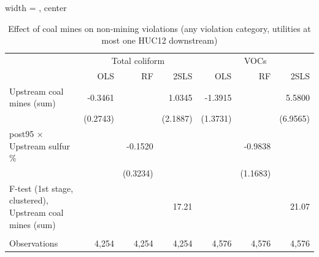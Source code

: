 
\begin{table}[htbp]
   
   \caption{\label{2sls_dwnstrm_nonminevio_allcat_ivsum} Effect of coal mines on non-mining violations (any violation category, utilities at most one HUC12 downstream)}
   \bigskip
   
   \centering
   
   \begin{adjustbox}{width = \textwidth, center}
      
      
      \begin{tabular}{lrrrrrr}
         \toprule
         
          & \multicolumn{3}{c}{Total coliform} & \multicolumn{3}{c}{VOCs}\\
         
                                                                  & OLS      & RF       & 2SLS     & OLS      & RF       & 2SLS\\  
         
         \midrule 
         Upstream coal mines (sum)                                & -0.3461  &          & 1.0345   & -1.3915  &          & 5.5800\\   
                                                                  & (0.2743) &          & (2.1887) & (1.3731) &          & (6.9565)\\   
         post95 $\times$ Upstream sulfur \%                       &          & -0.1520  &          &          & -0.9838  &   \\   
                                                                  &          & (0.3234) &          &          & (1.1683) &   \\   
         
         F-test (1st stage, clustered), Upstream coal mines (sum) &          &          & 17.21    &          &          & 21.07\\  
         
          \\
         
         Observations                                             & 4,254    & 4,254    & 4,254    & 4,576    & 4,576    & 4,576\\  
         
         \bottomrule
         
      \end{tabular}
      

\end{adjustbox}
\end{table}
